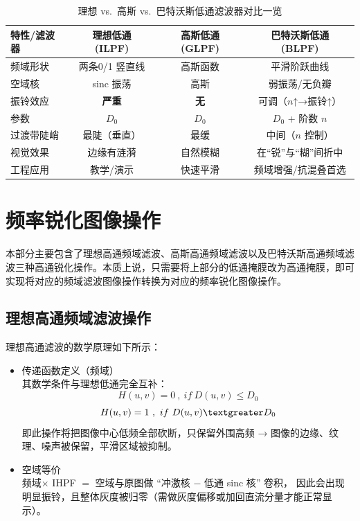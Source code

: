 \documentclass[11pt]{article}
\begin{document}
    \begin{center}
    \end{center}
   \begin{table}[htbp]
   	\centering
   	\caption{理想 vs.\ 高斯 vs.\ 巴特沃斯低通滤波器对比一览}
   	\label{tab:lpf-compare}
   	\begin{tabular}{@{}lccc@{}}
   		\toprule
   		\textbf{特性/滤波器} & \textbf{理想低通 (ILPF)} & \textbf{高斯低通 (GLPF)} & \textbf{巴特沃斯低通 (BLPF)}\\
   		\midrule
   		频域形状 & 两条0/1 竖直线 & 高斯函数 & 平滑阶跃曲线\\
   		空域核 & sinc 振荡 & 高斯 & 弱振荡/无负瓣\\
   		振铃效应 & \textbf{严重} & \textbf{无} & 可调（$n$↑→振铃↑）\\
   		参数 & \(D_0\) & \(D_0\) & \(D_0\) + 阶数 \(n\)\\
   		过渡带陡峭 & 最陡（垂直） & 最缓 & 中间（\(n\) 控制）\\
   		视觉效果 & 边缘有涟漪 & 自然模糊 & 在“锐”与“糊”间折中\\
   		工程应用 & 教学/演示 & 快速平滑 & 频域增强/抗混叠首选\\
   		\bottomrule
   	\end{tabular}
   \end{table}


\newpage
   \section{频率锐化图像操作}
   本部分主要包含了理想高通频域滤波、高斯高通频域滤波以及巴特沃斯高通频域滤波三种高通锐化操作。本质上说，只需要将上部分的低通掩膜改为高通掩膜，即可实现将对应的频域滤波图像操作转换为对应的频率锐化图像操作。
   \subsection{理想高通频域滤波操作}
   理想高通滤波的数学原理如下所示：
   \begin{itemize}
   	   \item 传递函数定义（频域）\\
   	其数学条件与理想低通完全互补：\\
   	$$H(u,v) = 0\ , \  if\ D(u,v) \leq D_0$$
   	$$H(u,v) = 1\ , \  if \  D(u,v) \textgreater D_0$$
   	即此操作将把图像中心低频全部砍断，只保留外围高频 → 图像的边缘、纹理、噪声被保留，平滑区域被抑制。
   	\item 空域等价\\
   	频域$\times$ IHPF $=$ 空域与原图做 “冲激核 − 低通 sinc 核” 卷积，
   	因此会出现 明显振铃，且整体灰度被归零（需做灰度偏移或加回直流分量才能正常显示）。
   \end{itemize}
  
\end{document}

